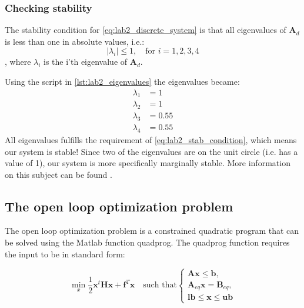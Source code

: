 \documentclass[../main.tex]{subfiles}
\begin{document}
\subsubsection{Checking stability}
The stability condition for \cref{eq:lab2_discrete_system} is that all eigenvalues of $ \bm A_d $ is less than one in absolute values, i.e.:
\begin{equation}\label{eq:lab2_stab_condition}
	|\lambda_i| \leq 1, \quad \text{for } i = 1, 2, 3, 4
\end{equation}, where $ \lambda_i $ is the i'th eigenvalue of $ \bm A_d $.

Using the script in \cref{lst:lab2_eigenvalues} the eigenvalues became:
\begin{subequations}\label{eq:lab2_eigenvalues}
	\begin{align}
		\lambda_1 &= 1 \\
		\lambda_2 &= 1 \\
		\lambda_3 &= 0.55 \\
		\lambda_4 &= 0.55
	\end{align}
\end{subequations}
All eigenvalues fulfills the requirement of \cref{eq:lab2_stab_condition}, which means our system is stable! Since two of the eigenvalues are on the unit circle (i.e. has a value of 1), our system is more specifically marginally stable. More information on this subject can be found .



\subsection{The open loop optimization problem}
The open loop optimization problem is a constrained quadratic program that can be solved using the Matlab function quadprog. The quadprog function requires the input to be in standard form:

\begin{equation}\label{eq:lab2_quadprog_std_form}
	\min_x \frac{1}{2} \bm x^t \bm H \bm x + \bm f^T \bm x \quad \text{such that} \begin{cases}
		\bm A \bm x \leq \bm b, \\
		\bm A_{eq} \bm x = \bm B_{eq}, \\
		\bm{lb} \leq \bm x \leq \bm{ub}		
	\end{cases}
\end{equation}
\end{document}
